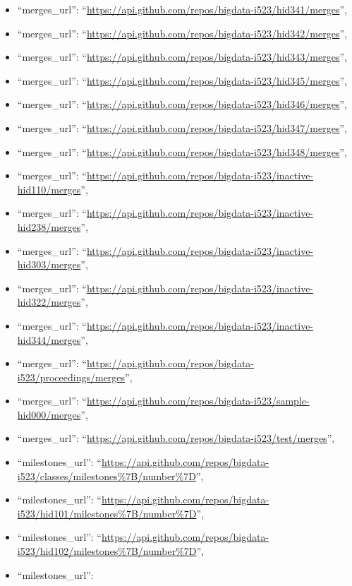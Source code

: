 \begin{itemize}
\item
  ``merges\_url'':
  ``\url{https://api.github.com/repos/bigdata-i523/hid341/merges}'',
\item
  ``merges\_url'':
  ``\url{https://api.github.com/repos/bigdata-i523/hid342/merges}'',
\item
  ``merges\_url'':
  ``\url{https://api.github.com/repos/bigdata-i523/hid343/merges}'',
\item
  ``merges\_url'':
  ``\url{https://api.github.com/repos/bigdata-i523/hid345/merges}'',
\item
  ``merges\_url'':
  ``\url{https://api.github.com/repos/bigdata-i523/hid346/merges}'',
\item
  ``merges\_url'':
  ``\url{https://api.github.com/repos/bigdata-i523/hid347/merges}'',
\item
  ``merges\_url'':
  ``\url{https://api.github.com/repos/bigdata-i523/hid348/merges}'',
\item
  ``merges\_url'':
  ``\url{https://api.github.com/repos/bigdata-i523/inactive-hid110/merges}'',
\item
  ``merges\_url'':
  ``\url{https://api.github.com/repos/bigdata-i523/inactive-hid238/merges}'',
\item
  ``merges\_url'':
  ``\url{https://api.github.com/repos/bigdata-i523/inactive-hid303/merges}'',
\item
  ``merges\_url'':
  ``\url{https://api.github.com/repos/bigdata-i523/inactive-hid322/merges}'',
\item
  ``merges\_url'':
  ``\url{https://api.github.com/repos/bigdata-i523/inactive-hid344/merges}'',
\item
  ``merges\_url'':
  ``\url{https://api.github.com/repos/bigdata-i523/proceedings/merges}'',
\item
  ``merges\_url'':
  ``\url{https://api.github.com/repos/bigdata-i523/sample-hid000/merges}'',
\item
  ``merges\_url'':
  ``\url{https://api.github.com/repos/bigdata-i523/test/merges}'',
\item
  ``milestones\_url'':
  ``\url{https://api.github.com/repos/bigdata-i523/classes/milestones\%7B/number\%7D}'',
\item
  ``milestones\_url'':
  ``\url{https://api.github.com/repos/bigdata-i523/hid101/milestones\%7B/number\%7D}'',
\item
  ``milestones\_url'':
  ``\url{https://api.github.com/repos/bigdata-i523/hid102/milestones\%7B/number\%7D}'',
\item
  ``milestones\_url'':

\end{itemize}
